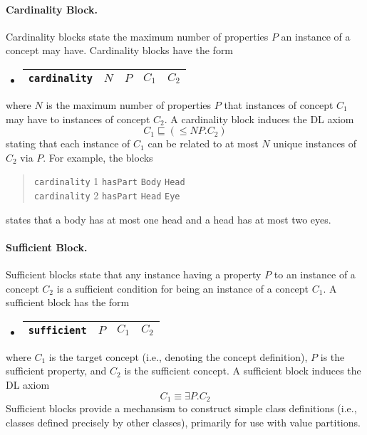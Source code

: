 \documentclass[11pt,onecolumn]{article}
\begin{document}
\paragraph{Cardinality Block.} Cardinality blocks state the maximum
number of properties $P$ an instance of a concept may have.
Cardinality blocks have the form
\begin{itemize}
\item[]
  \begin{tabular}{|l|l|l|l|l|}\hline \texttt{cardinality} & $N$ & $P$ & 
    $C_1$ & $C_2$ 
    \\ \hline
  \end{tabular}
\end{itemize}
where $N$ is the maximum number of properties $P$ that instances of
concept $C_1$ may have to instances of concept $C_2$. A cardinality
block induces the DL axiom \[C_1 \sqsubseteq (\le N P.C_2)\] stating
that each instance of $C_1$ can be related to at most $N$ unique
instances of $C_2$ via $P$. For example, the blocks
\begin{quote}
\texttt{cardinality} 1 \texttt{hasPart} \texttt{Body} \texttt{Head} \\
\texttt{cardinality} 2 \texttt{hasPart} \texttt{Head} \texttt{Eye}
\end{quote}
states that a body has at most one head and a head has at most two
eyes.


\paragraph{Sufficient Block.} Sufficient blocks state that any
instance having a property $P$ to an instance of a concept $C_2$ is a
sufficient condition for being an instance of a concept $C_1$. A
sufficient block has the form
\begin{itemize}
\item[]
  \begin{tabular}{|l|l|l|l|}\hline \texttt{sufficient} & $P$ & $C_1$ & $C_2$
    \\ \hline
  \end{tabular}
\end{itemize}
where $C_1$ is the target concept (i.e., denoting the concept
definition), $P$ is the sufficient property, and $C_2$ is the
sufficient concept. A sufficient block induces the DL axiom \[C_1
\equiv \exists P.C_2\] Sufficient blocks provide a mechansism to
construct simple class definitions (i.e., classes defined precisely by
other classes), primarily for use with value partitions.
\end{document}
